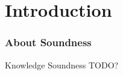 \section[Introduction]{Introduction} \label{sec:introduction}

\begin{frame}
	\frametitle{About Soundness}
	\begin{alertblock}{Knowledge Soundness}
		TODO?
	\end{alertblock}
\end{frame}
